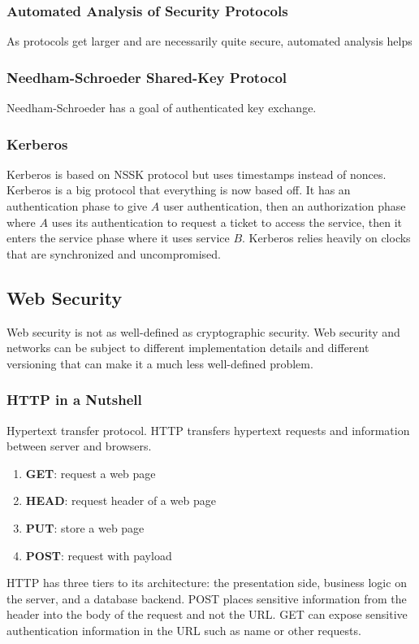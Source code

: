 \documentclass[11pt]{article}
\begin{document}
\subsubsection{Automated Analysis of Security Protocols}
As protocols get larger and are necessarily quite secure, automated analysis helps

\subsubsection{Needham-Schroeder Shared-Key Protocol}
Needham-Schroeder has a goal of authenticated key exchange.

\subsubsection{Kerberos}
Kerberos is based on NSSK protocol but uses timestamps instead of nonces.
Kerberos is a big protocol that everything is now based off.
It has an authentication phase to give $A$ user authentication, then an authorization phase where $A$ uses its authentication to request a ticket to access the service, then it enters the service phase where it uses service $B$.
Kerberos relies heavily on clocks that are synchronized and uncompromised.

\subsection{Web Security}
Web security is not as well-defined as cryptographic security.
Web security and networks can be subject to different implementation details and different versioning that can make it a much less well-defined problem.

\subsubsection{HTTP in a Nutshell}
Hypertext transfer protocol. 
HTTP transfers hypertext requests and information between server and browsers.
\begin{enumerate}
    \item \textbf{GET}: request a web page
    \item \textbf{HEAD}: request header of a web page
    \item \textbf{PUT}: store a web page
    \item \textbf{POST}: request with payload
\end{enumerate}

HTTP has three tiers to its architecture: the presentation side, business logic on the server, and a database backend.
POST places sensitive information from the header into the body of the request and not the URL.
GET can expose sensitive authentication information in the URL such as name or other requests.
\end{document}
